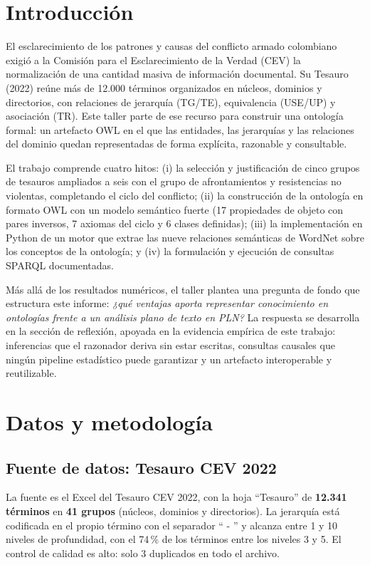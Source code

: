 \documentclass[11pt]{tg_usta}
\begin{document}
\section{Introducción}

El esclarecimiento de los patrones y causas del conflicto armado colombiano exigió a la Comisión para el Esclarecimiento de la Verdad (CEV) la normalización de una cantidad masiva de información documental. Su Tesauro (2022) reúne más de 12.000 términos organizados en núcleos, dominios y directorios, con relaciones de jerarquía (TG/TE), equivalencia (USE/UP) y asociación (TR). Este taller parte de ese recurso para construir una ontología formal: un artefacto OWL en el que las entidades, las jerarquías y las relaciones del dominio quedan representadas de forma explícita, razonable y consultable.

El trabajo comprende cuatro hitos: (i) la selección y justificación de cinco grupos de tesauros ampliados a seis con el grupo de afrontamientos y resistencias no violentas, completando el ciclo del conflicto; (ii) la construcción de la ontología en formato OWL con un modelo semántico fuerte (17 propiedades de objeto con pares inversos, 7 axiomas del ciclo y 6 clases definidas); (iii) la implementación en Python de un motor que extrae las nueve relaciones semánticas de WordNet sobre los conceptos de la ontología; y (iv) la formulación y ejecución de consultas SPARQL documentadas.

Más allá de los resultados numéricos, el taller plantea una pregunta de fondo que estructura este informe: \textit{¿qué ventajas aporta representar conocimiento en ontologías frente a un análisis plano de texto en PLN?} La respuesta se desarrolla en la sección de reflexión, apoyada en la evidencia empírica de este trabajo: inferencias que el razonador deriva sin estar escritas, consultas causales que ningún pipeline estadístico puede garantizar y un artefacto interoperable y reutilizable.


\section{Datos y metodología}

\subsection{Fuente de datos: Tesauro CEV 2022}

La fuente es el Excel del Tesauro CEV 2022, con la hoja ``Tesauro'' de \textbf{12.341 términos} en \textbf{41 grupos} (núcleos, dominios y directorios). La jerarquía está codificada en el propio término con el separador `` - '' y alcanza entre 1 y 10 niveles de profundidad, con el 74\,\% de los términos entre los niveles 3 y 5. El control de calidad es alto: solo 3 duplicados en todo el archivo.
\end{document}
